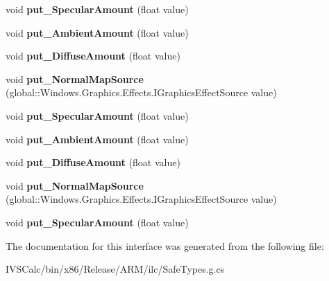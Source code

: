 \begin{DoxyCompactItemize}
void {\bfseries put\+\_\+\+Specular\+Amount} (float value)
\item 
\mbox{\label{interface_windows_1_1_u_i_1_1_composition_1_1_effects_1_1_i_scene_lighting_effect_a2697d682f51590be31691662ac2c0d31}} 
void {\bfseries put\+\_\+\+Ambient\+Amount} (float value)
\item 
\mbox{\label{interface_windows_1_1_u_i_1_1_composition_1_1_effects_1_1_i_scene_lighting_effect_a7ee00fd07a27405e243932bb66e4dec3}} 
void {\bfseries put\+\_\+\+Diffuse\+Amount} (float value)
\item 
\mbox{\label{interface_windows_1_1_u_i_1_1_composition_1_1_effects_1_1_i_scene_lighting_effect_a26b2c79266ad77b80b29a3faa553ac9f}} 
void {\bfseries put\+\_\+\+Normal\+Map\+Source} (global\+::\+Windows.\+Graphics.\+Effects.\+I\+Graphics\+Effect\+Source value)
\item 
\mbox{\label{interface_windows_1_1_u_i_1_1_composition_1_1_effects_1_1_i_scene_lighting_effect_a0c557dbe5e62bb783fd7f39b259eba96}} 
void {\bfseries put\+\_\+\+Specular\+Amount} (float value)
\item 
\mbox{\label{interface_windows_1_1_u_i_1_1_composition_1_1_effects_1_1_i_scene_lighting_effect_a2697d682f51590be31691662ac2c0d31}} 
void {\bfseries put\+\_\+\+Ambient\+Amount} (float value)
\item 
\mbox{\label{interface_windows_1_1_u_i_1_1_composition_1_1_effects_1_1_i_scene_lighting_effect_a7ee00fd07a27405e243932bb66e4dec3}} 
void {\bfseries put\+\_\+\+Diffuse\+Amount} (float value)
\item 
\mbox{\label{interface_windows_1_1_u_i_1_1_composition_1_1_effects_1_1_i_scene_lighting_effect_a26b2c79266ad77b80b29a3faa553ac9f}} 
void {\bfseries put\+\_\+\+Normal\+Map\+Source} (global\+::\+Windows.\+Graphics.\+Effects.\+I\+Graphics\+Effect\+Source value)
\item 
\mbox{\label{interface_windows_1_1_u_i_1_1_composition_1_1_effects_1_1_i_scene_lighting_effect_a0c557dbe5e62bb783fd7f39b259eba96}} 
void {\bfseries put\+\_\+\+Specular\+Amount} (float value)
\end{DoxyCompactItemize}


The documentation for this interface was generated from the following file\+:\begin{DoxyCompactItemize}
\item 
I\+V\+S\+Calc/bin/x86/\+Release/\+A\+R\+M/ilc/Safe\+Types.\+g.\+cs\end{DoxyCompactItemize}
